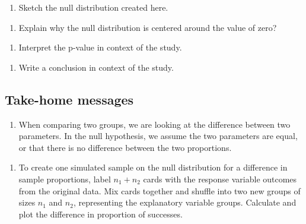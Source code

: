 \documentclass[
]{report}
\providecommand{\tightlist}{%
  \setlength{\itemsep}{0pt}\setlength{\parskip}{0pt}}
\begin{document}
\begin{enumerate}
\def\labelenumi{\arabic{enumi}.}
\setcounter{enumi}{8}
\tightlist
\item
  Sketch the null distribution created here.
\end{enumerate}

\vspace{1.5in}

\begin{enumerate}
\def\labelenumi{\arabic{enumi}.}
\setcounter{enumi}{9}
\tightlist
\item
  Explain why the null distribution is centered around the value of zero?
\end{enumerate}

\vspace{.8in}

\begin{enumerate}
\def\labelenumi{\arabic{enumi}.}
\setcounter{enumi}{10}
\tightlist
\item
  Interpret the p-value in context of the study.
\end{enumerate}

\vspace{1in}

\begin{enumerate}
\def\labelenumi{\arabic{enumi}.}
\setcounter{enumi}{11}
\tightlist
\item
  Write a conclusion in context of the study.
\end{enumerate}

\vspace{1in}

\subsection{Take-home messages}\label{take-home-messages-17}

\begin{enumerate}
\def\labelenumi{\arabic{enumi}.}
\tightlist
\item
  When comparing two groups, we are looking at the difference between two parameters. In the null hypothesis, we assume the two parameters are equal, or that there is no difference between the two proportions.
\end{enumerate}

\begin{enumerate}
\def\labelenumi{\arabic{enumi}.}
\setcounter{enumi}{1}
\tightlist
\item
  To create one simulated sample on the null distribution for a difference in sample proportions, label \(n_1 + n_2\) cards with the response variable outcomes from the original data. Mix cards together and shuffle into two new groups of sizes \(n_1\) and \(n_2\), representing the explanatory variable groups. Calculate and plot the difference in proportion of successes.
\end{enumerate}
\end{document}
